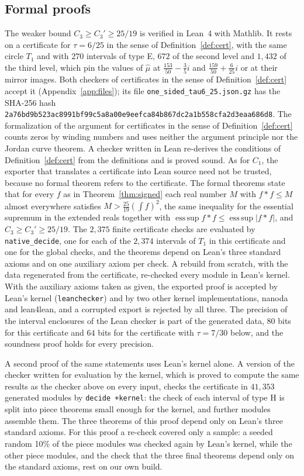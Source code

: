 \documentclass[11pt]{amsart}
\theoremstyle{definition}
\theoremstyle{remark}
\numberwithin{equation}{section}
\newcommand{\esssup}{\operatorname*{ess\,sup}}
\newcommand{\PinPoint}{\tfrac{153}{50}-\tfrac35i}
\newcommand{\PinPointTwo}{\tfrac{159}{50}+\tfrac{6}{25}i}
\newcommand{\LeanSigFrac}{\tfrac{25}{19}}
\newcommand{\LeanSigSlash}{25/19}
\newcommand{\LeanSInt}{2{,}374}
\newcommand{\LeanSChecks}{2{,}375}
\newcommand{\LeanKMods}{41{,}353}
\newcommand{\TabE}{270}
\newcommand{\TabH}{672}
\newcommand{\TabHthree}{1{,}432}
\newcommand{\TabFile}{one\_sided\_tau6\_25.json.gz}
\newcommand{\TabSha}{2a76bd9b523ac8991bf99c5a8a00e9eefca84b867dc2a1b558cfa2d3eaa686d8}
\begin{document}
\subsection*{Formal proofs}
The weaker bound $C_3\ge C_3'\ge\LeanSigSlash$ is verified in Lean~4 with Mathlib. It rests on a certificate for $\tau=6/25$ in the sense of Definition~\ref{def:cert}, with the same circle $T_1$ and with $\TabE$ intervals of type E, $\TabH$ of the second level and $\TabHthree$ of the third level, which pin the values of $\hat\mu$ at $\PinPoint$ and $\PinPointTwo$ or at their mirror images. Both checkers of certificates in the sense of Definition~\ref{def:cert} accept it (Appendix~\ref{app:files}); its file \texttt{\TabFile} has the SHA-256 hash \texttt{\scriptsize \TabSha}. The formalization of the argument for certificates in the sense of Definition~\ref{def:cert} counts zeros by winding numbers and uses neither the argument principle nor the Jordan curve theorem. A checker written in Lean re-derives the conditions of Definition~\ref{def:cert} from the definitions and is proved sound. As for $C_1$, the exporter that translates a certificate into Lean source need not be trusted, because no formal theorem refers to the certificate. The formal theorems state that for every $f$ as in Theorem~\ref{thm:signed} each real number $M$ with $f*f\le M$ almost everywhere satisfies $M>\LeanSigFrac(\int f)^2$, the same inequality for the essential supremum in the extended reals together with $\esssup f*f\le\esssup|f*f|$, and $C_3\ge C_3'\ge\LeanSigSlash$. The $\LeanSChecks$ finite certificate checks are evaluated by \texttt{native\_decide}, one for each of the $\LeanSInt$ intervals of $T_1$ in this certificate and one for the global checks, and the theorems depend on Lean's three standard axioms and on one auxiliary axiom per check. A rebuild from scratch, with the data regenerated from the certificate, re-checked every module in Lean's kernel. With the auxiliary axioms taken as given, the exported proof is accepted by Lean's kernel (\texttt{leanchecker}) and by two other kernel implementations, nanoda and lean4lean, and a corrupted export is rejected by all three. The precision of the interval enclosures of the Lean checker is part of the generated data, $80$ bits for this certificate and $64$ bits for the certificate with $\tau=7/30$ below, and the soundness proof holds for every precision.

A second proof of the same statements uses Lean's kernel alone. A version of the checker written for evaluation by the kernel, which is proved to compute the same results as the checker above on every input, checks the certificate in $\LeanKMods$ generated modules by \texttt{decide +kernel}: the check of each interval of type H is split into piece theorems small enough for the kernel, and further modules assemble them. The three theorems of this proof depend only on Lean's three standard axioms. For this proof a re-check covered only a sample: a seeded random 10\% of the piece modules was checked again by Lean's kernel, while the other piece modules, and the check that the three final theorems depend only on the standard axioms, rest on our own build.
\end{document}
